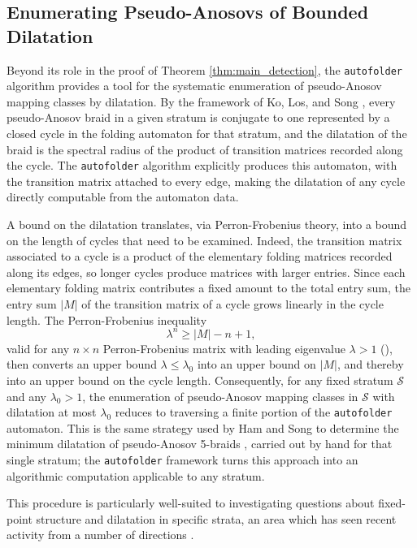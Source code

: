\subsection{Enumerating Pseudo-Anosovs of Bounded Dilatation}
\label{subsec:dilatation_enumeration_intro}

Beyond its role in the proof of Theorem \ref{thm:main_detection}, the \texttt{autofolder} algorithm provides a tool for the systematic enumeration of pseudo-Anosov mapping classes by dilatation. By the framework of Ko, Los, and Song \cite{SongEntropy}, every pseudo-Anosov braid in a given stratum is conjugate to one represented by a closed cycle in the folding automaton for that stratum, and the dilatation of the braid is the spectral radius of the product of transition matrices recorded along the cycle. The \texttt{autofolder} algorithm explicitly produces this automaton, with the transition matrix attached to every edge, making the dilatation of any cycle directly computable from the automaton data.

A bound on the dilatation translates, via Perron-Frobenius theory, into a bound on the length of cycles that need to be examined. Indeed, the transition matrix associated to a cycle is a product of the elementary folding matrices recorded along its edges, so longer cycles produce matrices with larger entries. Since each elementary folding matrix contributes a fixed amount to the total entry sum, the entry sum $|M|$ of the transition matrix of a cycle grows linearly in the cycle length. The Perron-Frobenius inequality
\[
\lambda^n \geq |M| - n + 1,
\]
valid for any $n \times n$ Perron-Frobenius matrix with leading eigenvalue $\lambda > 1$ (\cite[Lemma~3.1]{HamSong2007}), then converts an upper bound $\lambda \leq \lambda_0$ into an upper bound on $|M|$, and thereby into an upper bound on the cycle length. Consequently, for any fixed stratum $\mathcal{S}$ and any $\lambda_0 > 1$, the enumeration of pseudo-Anosov mapping classes in $\mathcal{S}$ with dilatation at most $\lambda_0$ reduces to traversing a finite portion of the \texttt{autofolder} automaton. This is the same strategy used by Ham and Song to determine the minimum dilatation of pseudo-Anosov 5-braids \cite{HamSong2007}, carried out by hand for that single stratum; the \texttt{autofolder} framework turns this approach into an algorithmic computation applicable to any stratum.

This procedure is particularly well-suited to investigating questions about fixed-point structure and dilatation in specific strata, an area which has seen recent activity from a number of directions \cite{AougabFuterTaylor2025}.

